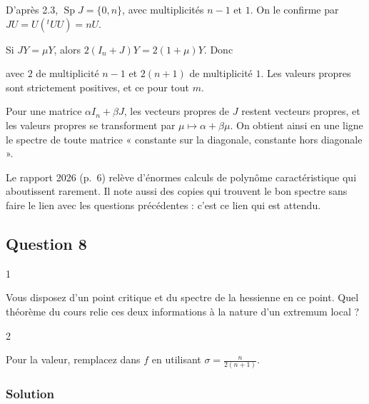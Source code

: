 \documentclass[11pt,a4paper]{article}
\newcommand{\equationajustee}[1]{%
  \sbox{\boiteequation}{$\displaystyle #1$}%
  \ifdim\wd\boiteequation>\linewidth
    \[\resizebox{\linewidth}{!}{\usebox{\boiteequation}}\]%
  \else
    \[#1\]%
  \fi}
\begin{document}
D'après 2.3, \(\operatorname{Sp}J=\{0,n\}\), avec multiplicités \(n-1\) et \(1\). On le confirme par \(JU=U({}^tUU)=nU\).

Si \(JY=\mu Y\), alors \(2(I_n+J)Y=2(1+\mu)Y\). Donc

\equationajustee{\operatorname{Sp}H_f(m)=\{2,\ 2(n+1)\},}

avec \(2\) de multiplicité \(n-1\) et \(2(n+1)\) de multiplicité \(1\). Les valeurs propres sont strictement positives, et ce pour tout \(m\).

\begin{methode}

Pour une matrice \(\alpha I_n+\beta J\), les vecteurs propres de \(J\) restent vecteurs propres, et les valeurs propres se transforment par \(\mu\mapsto\alpha+\beta\mu\). On obtient ainsi en une ligne le spectre de toute matrice « constante sur la diagonale, constante hors diagonale ».

\end{methode}

\begin{piege}

Le rapport 2026 (p.~6) relève d'énormes calculs de polynôme caractéristique qui aboutissent rarement. Il note aussi des copies qui trouvent le bon spectre sans faire le lien avec les questions précédentes : c'est ce lien qui est attendu.

\end{piege}

\hypertarget{question-8}{%
\subsection{Question 8}\label{question-8}}

\begin{indication}{1}

Vous disposez d'un point critique et du spectre de la hessienne en ce point. Quel théorème du cours relie ces deux informations à la nature d'un extremum local ?

\end{indication}

\begin{indication}{2}

Pour la valeur, remplacez dans \(f\) en utilisant \(\sigma=\frac n{2(n+1)}\).

\end{indication}

\hypertarget{solution-12}{%
\subsubsection{Solution}\label{solution-12}}
\end{document}
